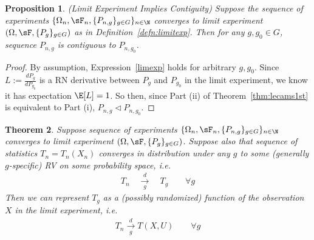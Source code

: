 \documentclass[12pt]{article}
\theoremstyle{plain}
\newtheorem{thm}{Theorem}[section]
\newtheorem{prop}[thm]{Proposition}
\theoremstyle{definition}
\theoremstyle{remark}
\newtheorem*{rmk}{Remark}
\newcommand{\dto}{\xrightarrow{d}}
\begin{document}
\begin{prop}\emph{(Limit Experiment Implies Contiguity)}
\label{prop:impcontiguity}
Suppose the sequence of experiments
$\{\Omega_n,\sF_n,\{P_{n,g}\}_{g\in G}\}_{n\in\N}$
converges to limit experiment $(\Omega,\sF,\{P_{g}\}_{g\in G})$
as in Definition~\ref{defn:limitexp}.
Then for any $g,g_0\in G$,
sequence $P_{n,g}$ is contiguous to $P_{n,g_0}$.
\end{prop}
\begin{proof}
By assumption, Expression~\ref{limexp} holds for arbitrary $g,g_0$.
Since $L:=\frac{dP_g}{dP_{g_0}}$ is a RN derivative between $P_{g}$ and
$P_{g_0}$ in the limit experiment, we know it has expectation $\E[L]=1$.
So then, since Part (ii) of Theorem~\ref{thm:lecams1st} is equivalent to
Part (i), $P_{n,g}\vartriangleleft P_{n,g_0}$.
\end{proof}

\begin{thm}
\label{thm:limitexp}
Suppose sequence of experiments
$\{\Omega_n,\sF_n,\{P_{n,g}\}_{g\in G}\}_{n\in\N}$
converges to limit experiment
$(\Omega,\sF,\{P_{g}\}_{g\in G})$.
Suppose also that sequence of statistics $T_n=T_n(X_n)$ converges in
distribution under any $g$ to \emph{some} (generally $g$-specific) RV on
some probability space, i.e.
\begin{align*}
  T_n \quad\underset{g}{\dto}\quad T_g
  \qquad\forall g
\end{align*}
Then we can represent $T_g$ as a (possibly randomized) function of the
observation $X$ in the limit experiment, i.e.
\begin{align*}
  T_n \underset{g}{\dto} T(X,U)
  \qquad
  \forall g
\end{align*}
\end{thm}
\end{document}
